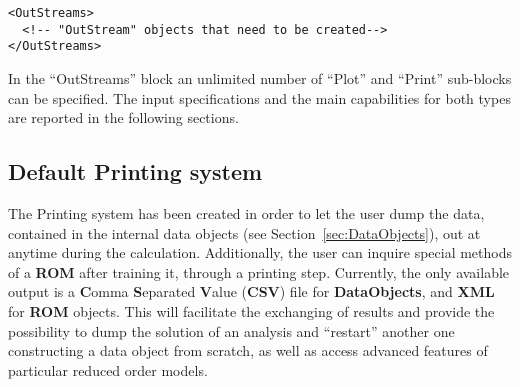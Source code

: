 \begin{lstlisting}[style=XML]
<OutStreams>
  <!-- "OutStream" objects that need to be created-->
</OutStreams>
\end{lstlisting}

In the ``OutStreams'' block an unlimited number of ``Plot'' and ``Print''
sub-blocks can be specified.
%
The input specifications and the main capabilities for both types are reported
in the following sections.
%
%
\subsection{Default Printing system \label{sec:printing}}
The Printing system has been created in order to let the user dump the data,
contained in the internal data objects (see Section~\ref{sec:DataObjects}), out
at anytime during the calculation.
%
Additionally, the user can inquire special methods of a \textbf{ROM} after training it,
through a printing step.
%
Currently, the only available output is a \textbf{C}omma \textbf{S}eparated
\textbf{V}alue (\textbf{CSV}) file for \textbf{DataObjects}, and \textbf{XML}
for \textbf{ROM} objects.
%
%
This will facilitate the exchanging of results and provide the possibility to
dump the solution of an analysis and ``restart'' another one constructing a
data object from scratch, as well as access advanced features of particular
reduced order models.
%

